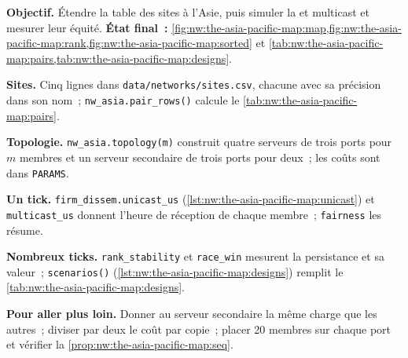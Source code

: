 \begin{tutorial}
\textbf{Objectif.} Étendre la table des sites à l'Asie, puis simuler la  et multicast et mesurer leur équité.
\textbf{État final~:} \cref{fig:nw:the-asia-pacific-map:map,fig:nw:the-asia-pacific-map:rank,fig:nw:the-asia-pacific-map:sorted} et
\cref{tab:nw:the-asia-pacific-map:pairs,tab:nw:the-asia-pacific-map:designs}.
\begin{tutsteps}
\item \textbf{Sites.} Cinq lignes dans \texttt{data/networks/sites.csv}, chacune avec sa précision dans son nom~; \texttt{nw\_asia.pair\_rows()} calcule
  le \cref{tab:nw:the-asia-pacific-map:pairs}.
\item \textbf{Topologie.} \texttt{nw\_asia.topology(m)} construit quatre serveurs de trois ports pour $m$ membres et un serveur secondaire de trois ports pour
  deux~; les coûts sont dans \texttt{PARAMS}.
\item \textbf{Un tick.} \texttt{firm\_dissem.unicast\_us} (\cref{lst:nw:the-asia-pacific-map:unicast}) et \texttt{multicast\_us} donnent l'heure de réception de
  chaque membre~; \texttt{fairness} les résume.
\item \textbf{Nombreux ticks.} \texttt{rank\_stability} et \texttt{race\_win} mesurent la persistance et sa valeur~; \texttt{scenarios()}
  (\cref{lst:nw:the-asia-pacific-map:designs}) remplit le \cref{tab:nw:the-asia-pacific-map:designs}.
\end{tutsteps}
\textbf{Pour aller plus loin.} Donner au serveur secondaire la même charge que les autres~; diviser par deux le coût par copie~; placer 20 membres sur chaque port et
vérifier la \cref{prop:nw:the-asia-pacific-map:seq}.
\end{tutorial}

\begin{omfigure}

\label{fig:nw:the-asia-pacific-map:sorted}
\end{omfigure}


